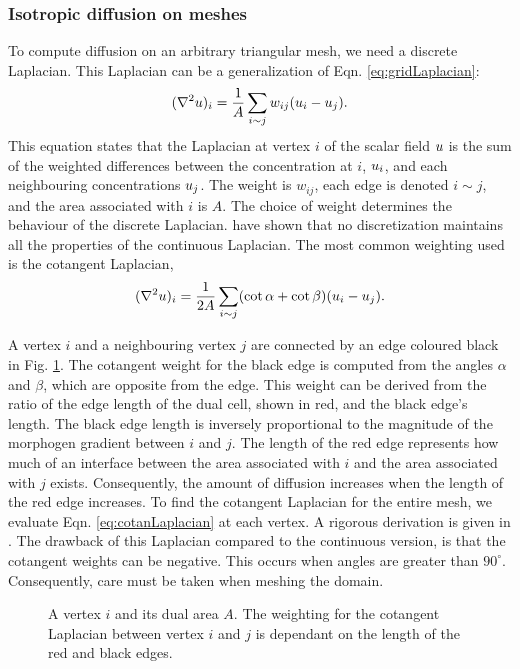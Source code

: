 \subsubsection*{Isotropic diffusion on meshes}
To compute diffusion on an arbitrary triangular mesh, we need a discrete Laplacian. This Laplacian can be a generalization of Eqn. \ref{eq:gridLaplacian}:
\begin{equation}
(\nabla^2{} u)_i = \frac{1}{A} \sum_{i \sim j} w_{ij}(u_i - u_j).
\end{equation}
This equation states that the Laplacian at vertex $i$ of the scalar field $u$ is the sum of the weighted differences between the concentration at $i$, $u_i$, and each neighbouring concentrations $u_j$. The weight is $w_{ij}$, each edge is denoted $i \sim j$, and the area associated with $i$ is $A$. The choice of weight determines the behaviour of the discrete Laplacian. \citet{wardetzky2007} have shown that no discretization maintains all the properties of the continuous Laplacian. The most common weighting used is the cotangent Laplacian,
\begin{equation}
	(\nabla^2{} u)_i = \frac{1}{2A} \sum_{i \sim j} (\cot{\alpha} + \cot{\beta)} (u_i - u_j).
	\label{eq:cotanLaplacian}
\end{equation}

A vertex $i$ and a neighbouring vertex $j$ are connected by an edge coloured black in Fig. \ref{fig:dualMesh}. The cotangent weight for the black edge is computed from the angles $\alpha$ and $\beta$, which are opposite from the edge. This weight can be derived from the ratio of the edge length of the dual cell, shown in red, and the black edge's length. The black edge length is inversely proportional to the magnitude of the morphogen gradient between $i$ and $j$. The length of the red edge represents how much of an interface between the area associated with $i$ and the area associated with $j$ exists. Consequently, the amount of diffusion increases when the length of the red edge increases. To find the cotangent Laplacian for the entire mesh, we evaluate Eqn. \ref{eq:cotanLaplacian} at each vertex. A rigorous derivation is given in \citep{crane2013, herholz2013}. The drawback of this Laplacian compared to the continuous version, is that the cotangent weights can be negative. This occurs when angles are greater than $90^\circ$. Consequently, care must be taken when meshing the domain.

\begin{figure}[H]
	\centering
	\caption{A vertex $i$ and its dual area $A$. The weighting for the cotangent Laplacian between vertex $i$ and $j$ is dependant on the length of the red and black edges.}
	\label{fig:dualMesh}
\end{figure}

